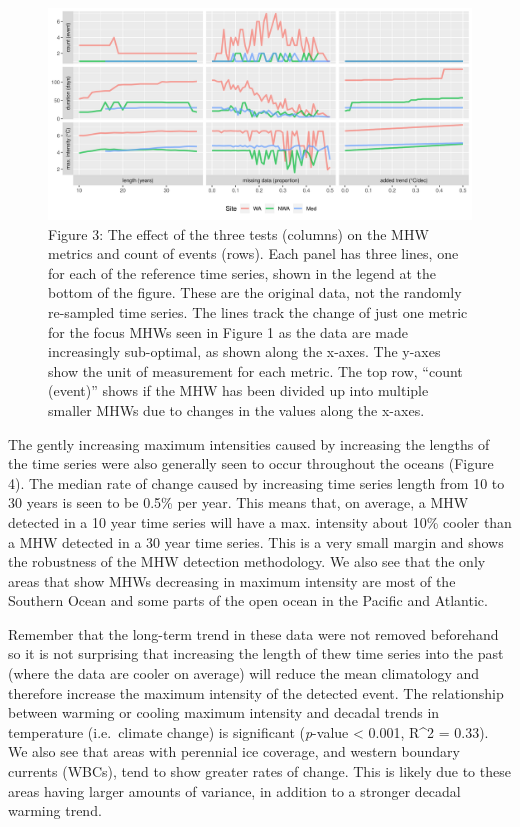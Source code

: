 \documentclass[]{article}
\begin{document}
{\begin{figure}
\centering
\includegraphics{../LaTeX/fig_3.png}
\caption{Figure 3: The effect of the three tests (columns) on the MHW
metrics and count of events (rows). Each panel has three lines, one for
each of the reference time series, shown in the legend at the bottom of
the figure. These are the original data, not the randomly re-sampled
time series. The lines track the change of just one metric for the focus
MHWs seen in Figure 1 as the data are made increasingly sub-optimal, as
shown along the x-axes. The y-axes show the unit of measurement for each
metric. The top row, ``count (event)'' shows if the MHW has been divided
up into multiple smaller MHWs due to changes in the values along the
x-axes.}
\end{figure}

The gently increasing maximum intensities caused by increasing the
lengths of the time series were also generally seen to occur throughout
the oceans (Figure 4). The median rate of change caused by increasing
time series length from 10 to 30 years is seen to be 0.5\% per year.
This means that, on average, a MHW detected in a 10 year time series
will have a max. intensity about 10\% cooler than a MHW detected in a 30
year time series. This is a very small margin and shows the robustness
of the MHW detection methodology. We also see that the only areas that
show MHWs decreasing in maximum intensity are most of the Southern Ocean
and some parts of the open ocean in the Pacific and Atlantic.

Remember that the long-term trend in these data were not removed
beforehand so it is not surprising that increasing the length of thew
time series into the past (where the data are cooler on average) will
reduce the mean climatology and therefore increase the maximum intensity
of the detected event. The relationship between warming or cooling
maximum intensity and decadal trends in temperature (i.e.~climate
change) is significant (\emph{p}-value \textless{} 0.001, R\^{}2 =
0.33). We also see that areas with perennial ice coverage, and western
boundary currents (WBCs), tend to show greater rates of change. This is
likely due to these areas having larger amounts of variance, in addition
to a stronger decadal warming trend.

}
\end{document}
